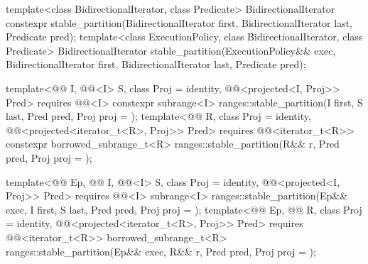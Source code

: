 %
\begin{itemdecl}
template<class BidirectionalIterator, class Predicate>
  BidirectionalIterator
    constexpr stable_partition(BidirectionalIterator first, BidirectionalIterator last,
                               Predicate pred);
template<class ExecutionPolicy, class BidirectionalIterator, class Predicate>
  BidirectionalIterator
    stable_partition(ExecutionPolicy&& exec,
                     BidirectionalIterator first, BidirectionalIterator last, Predicate pred);

template<@@ I, @@<I> S, class Proj = identity,
         @@<projected<I, Proj>> Pred>
  requires @@<I>
  constexpr subrange<I> ranges::stable_partition(I first, S last, Pred pred, Proj proj = {});
template<@@ R, class Proj = identity,
         @@<projected<iterator_t<R>, Proj>> Pred>
  requires @@<iterator_t<R>>
  constexpr borrowed_subrange_t<R> ranges::stable_partition(R&& r, Pred pred, Proj proj = {});

template<@@ Ep, @@ I, @@<I> S,
         class Proj = identity, @@<projected<I, Proj>> Pred>
  requires @@<I>
  subrange<I>
    ranges::stable_partition(Ep&& exec, I first, S last, Pred pred, Proj proj = {});
template<@@ Ep, @@ R, class Proj = identity,
         @@<projected<iterator_t<R>, Proj>> Pred>
  requires @@<iterator_t<R>>
  borrowed_subrange_t<R>
    ranges::stable_partition(Ep&& exec, R&& r, Pred pred, Proj proj = {});
\end{itemdecl}

